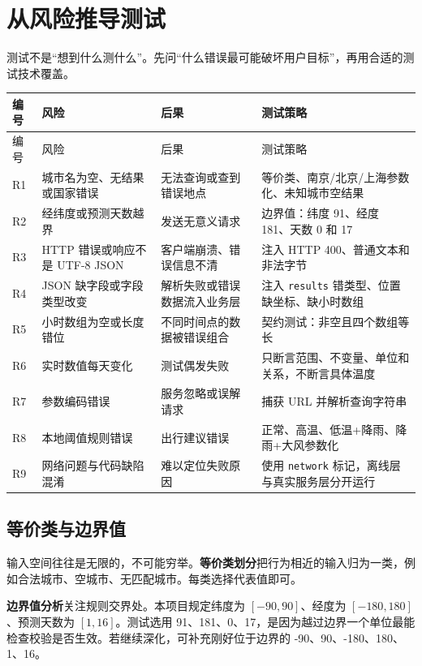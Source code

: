 \documentclass[UTF8,zihao=-4,a4paper]{ctexart}
\newcommand{\term}[1]{\textbf{#1}}
\newcommand{\code}[1]{\texttt{#1}}
\begin{document}
\section{从风险推导测试}

测试不是“想到什么测什么”。先问“什么错误最可能破坏用户目标”，再用合适的测试技术覆盖。

\begin{longtable}{p{}p{}p{}p{}}
\toprule
编号 & 风险 & 后果 & 测试策略 \\
\midrule
\endfirsthead
\toprule
编号 & 风险 & 后果 & 测试策略 \\
\midrule
\endhead
R1 & 城市名为空、无结果或国家错误 & 无法查询或查到错误地点 & 等价类、南京/北京/上海参数化、未知城市空结果 \\
R2 & 经纬度或预测天数越界 & 发送无意义请求 & 边界值：纬度 91、经度 181、天数 0 和 17 \\
R3 & HTTP 错误或响应不是 UTF-8 JSON & 客户端崩溃、错误信息不清 & 注入 HTTP 400、普通文本和非法字节 \\
R4 & JSON 缺字段或字段类型改变 & 解析失败或错误数据流入业务层 & 注入 \code{results} 错类型、位置缺坐标、缺小时数组 \\
R5 & 小时数组为空或长度错位 & 不同时间点的数据被错误组合 & 契约测试：非空且四个数组等长 \\
R6 & 实时数值每天变化 & 测试偶发失败 & 只断言范围、不变量、单位和关系，不断言具体温度 \\
R7 & 参数编码错误 & 服务忽略或误解请求 & 捕获 URL 并解析查询字符串 \\
R8 & 本地阈值规则错误 & 出行建议错误 & 正常、高温、低温+降雨、降雨+大风参数化 \\
R9 & 网络问题与代码缺陷混淆 & 难以定位失败原因 & 使用 \code{network} 标记，离线层与真实服务层分开运行 \\
\bottomrule
\end{longtable}

\subsection{等价类与边界值}

输入空间往往是无限的，不可能穷举。\term{等价类划分}把行为相近的输入归为一类，例如合法城市、空城市、无匹配城市。每类选择代表值即可。

\term{边界值分析}关注规则交界处。本项目规定纬度为 $[-90,90]$、经度为 $[-180,180]$、预测天数为 $[1,16]$。测试选用 91、181、0、17，是因为越过边界一个单位最能检查校验是否生效。若继续深化，可补充刚好位于边界的 -90、90、-180、180、1、16。
\end{document}
